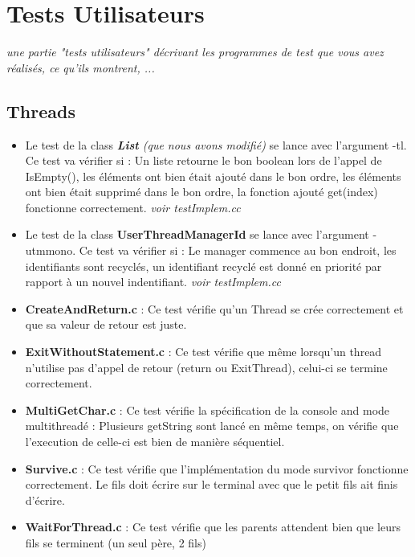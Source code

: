 \documentclass{article}
\begin{document}
\newpage
\section{Tests Utilisateurs}
\textit{une partie "tests utilisateurs" décrivant les programmes de test que vous avez réalisés, ce qu'ils montrent, ...}
\vspace{5mm}

\subsection{Threads}

\begin{itemize}
	\item Le test de la class \textit{\textbf{ List} (que nous avons modifié)} se lance avec l'argument -tl. Ce test va vérifier si : Un liste retourne le bon boolean lors de l'appel de IsEmpty(), les éléments ont bien était ajouté dans le bon ordre, les éléments ont bien était supprimé dans le bon ordre, la fonction ajouté get(index) fonctionne correctement. \textit{voir testImplem.cc}


\item Le test de la class \textbf{UserThreadManagerId} se lance avec l'argument -utmmono. Ce test va vérifier si : Le manager commence au bon endroit, les identifiants sont recyclés, un identifiant recyclé est donné en priorité par rapport à un nouvel indentifiant. \textit{voir testImplem.cc}

\item \textbf{CreateAndReturn.c} : Ce test vérifie qu'un Thread se crée correctement et que sa valeur de retour est juste.
	
\item \textbf{ExitWithoutStatement.c} : Ce test vérifie que même lorsqu'un thread n'utilise pas d'appel de retour (return ou ExitThread), celui-ci se termine correctement.
	
\item \textbf{MultiGetChar.c} : Ce test vérifie la spécification de la console and mode multithreadé : Plusieurs getString sont lancé en même temps, on vérifie que l'execution de celle-ci est bien de manière séquentiel.

	
\item \textbf{Survive.c} : Ce test vérifie que l'implémentation du mode survivor fonctionne correctement. Le fils doit écrire sur le terminal avec que le petit fils ait finis d'écrire.
	
\item \textbf{WaitForThread.c} : Ce test vérifie que les parents attendent bien que leurs fils se terminent (un seul père, 2 fils)


\end{itemize}
\end{document}

